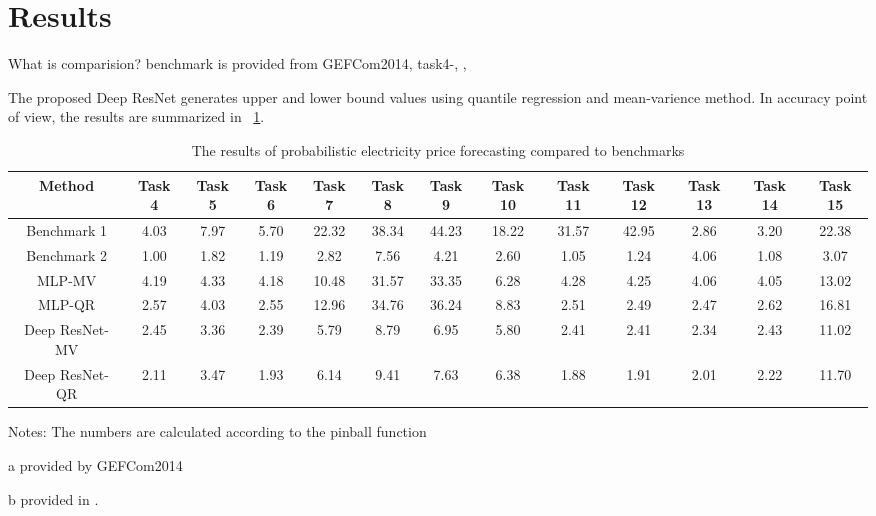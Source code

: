 \documentclass[review]{elsarticle}
\begin{document}
  \section{Results}
    What is comparision? benchmark is provided from GEFCom2014, task4-\cite{Dudek2016}, \cite{Maciejowska2016}, \cite{Khosravi2011}

    The proposed Deep ResNet generates upper and lower bound values using quantile regression and mean-varience method.
    In accuracy point of view, the results are summarized in ~\ref{table:result_pinball}.

    \begin{table}[H]
      \caption{The results of probabilistic electricity price forecasting compared to benchmarks}
      \begin{adjustbox}{width=\textwidth}
      \begin{threeparttable}
        \begin{center}
          \begin{tabular}{ccccccccccccc}
            \hline
            Method & Task 4 & Task 5& Task 6 & Task 7& Task 8 & Task 9& Task 10 & Task 11& Task 12 & Task 13 & Task 14 & Task 15\\
            \hline
            Benchmark 1 \tnote{a} & 4.03 & 7.97 & 5.70 & 22.32 & 38.34 & 44.23 & 18.22 & 31.57 & 42.95 & 2.86 & 3.20 & 22.38\\
            Benchmark 2 \tnote{b} & 1.00 & 1.82 & 1.19 & 2.82 & 7.56 & 4.21 & 2.60 & 1.05 & 1.24 & 4.06 & 1.08 & 3.07 \\
            \hline
            MLP-MV & 4.19 & 4.33 & 4.18 & 10.48 & 31.57 & 33.35 & 6.28 & 4.28 & 4.25 & 4.06 & 4.05 & 13.02\\
            MLP-QR & 2.57 & 4.03 & 2.55 & 12.96 & 34.76 & 36.24 & 8.83 & 2.51 & 2.49 & 2.47 & 2.62 & 16.81\\
            Deep ResNet-MV& 2.45 & 3.36 & 2.39 & 5.79 & 8.79 & 6.95 & 5.80 & 2.41 & 2.41 & 2.34 & 2.43 & 11.02 \\
            Deep ResNet-QR& 2.11& 3.47& 1.93 & 6.14 & 9.41 & 7.63 & 6.38 & 1.88 & 1.91 & 2.01 & 2.22 &11.70 \\
            \hline
          \end{tabular}
          \begin{tablenotes}
            Notes: The numbers are calculated according to the pinball function
            \item[a] provided by GEFCom2014
            \item[b] provided in \cite{Maciejowska2016}.
          \end{tablenotes}
          \end{center}
      \end{threeparttable}
      \end{adjustbox}
      \label{table:result_pinball}
    \end{table}
\end{document}

